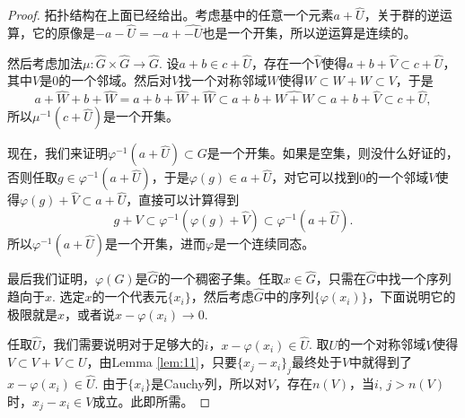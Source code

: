\begin{proof}
	拓扑结构在上面已经给出。考虑基中的任意一个元素$a+\hat{U}$，关于群的逆运算，它的原像是$-a-\hat{U}=-a+\widehat{-U}$也是一个开集，所以逆运算是连续的。

	然后考虑加法$\mu:\hat G\times \hat G\to \hat G$. 设$a+b\in c+\hat{U}$，存在一个$\hat{V}$使得$a+b+\hat{V}\subset c+\hat{U}$，其中$V$是$0$的一个邻域。然后对$V$找一个对称邻域$W$使得$W\subset W+W\subset V$，于是
	\[
	a+\hat{W}+b+\hat{W}=a+b+\hat{W}+\hat{W}\subset a+b+\widehat{W+W}\subset a+b+\widehat{V}\subset c+\hat{U},
	\]
	所以$\mu^{-1}(c+\hat{U})$是一个开集。

	现在，我们来证明$\varphi^{-1}(a+\hat{U})\subset G$是一个开集。如果是空集，则没什么好证的，否则任取$g\in \varphi^{-1}(a+\hat{U})$，于是$\varphi(g)\in a+\hat{U}$，对它可以找到$0$的一个邻域$V$使得$\varphi(g)+\hat{V}\subset a+\hat{U}$，直接可以计算得到
	\[
	g+V\subset \varphi^{-1}(\varphi(g)+\hat{V})\subset \varphi^{-1}(a+\hat U).
	\]
	所以$\varphi^{-1}(a+\hat U)$是一个开集，进而$\varphi$是一个连续同态。

	最后我们证明，$\varphi(G)$是$\hat{G}$的一个稠密子集。任取$x\in \hat{G}$，只需在$\hat{G}$中找一个序列趋向于$x$. 选定$x$的一个代表元$\{x_i\}$，然后考虑$\hat{G}$中的序列$\{\varphi(x_i)\}$，下面说明它的极限就是$x$，或者说$x-\varphi(x_i)\to 0$. 

	任取$\hat{U}$，我们需要说明对于足够大的$i$，$x-\varphi(x_i)\in \hat{U}$. 取$U$的一个对称邻域$V$使得$V\subset V+V\subset U$，由Lemma \ref{lem:11}，只要$\{x_j-x_i\}_j$最终处于$V$中就得到了$x-\varphi(x_i)\in \hat{U}$. 由于$\{x_i\}$是Cauchy列，所以对$V$，存在$n(V)$，当$i$, $j>n(V)$时，$x_j-x_i\in V$成立。此即所需。
\end{proof}

